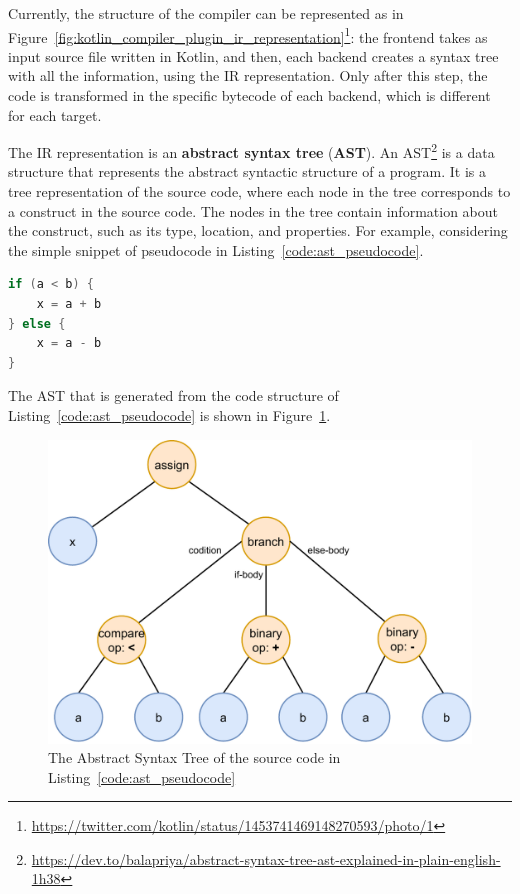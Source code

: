 Currently, the structure of the compiler can be represented as in Figure~\ref{fig:kotlin_compiler_plugin_ir_representation}\footnote{\url{https://twitter.com/kotlin/status/1453741469148270593/photo/1}}: the frontend takes as input source file written in Kotlin, and then, each backend creates a syntax tree with all the information, using the IR representation. Only after this step, the code is transformed in the specific bytecode of each backend, which is different for each target.

The IR representation is an \textbf{abstract syntax tree} (\textbf{AST}). An AST\footnote{\url{https://dev.to/balapriya/abstract-syntax-tree-ast-explained-in-plain-english-1h38}} is a data structure that represents the abstract syntactic structure of a program. It is a tree representation of the source code, where each node in the tree corresponds to a construct in the source code. The nodes in the tree contain information about the construct, such as its type, location, and properties.\newline
For example, considering the simple snippet of pseudocode in Listing~\ref{code:ast_pseudocode}.
\begin{lstlisting}[caption={Pseudocode of a simple assignment and expression}, language=Kotlin, captionpos=b, label={code:ast_pseudocode}]
if (a < b) {
    x = a + b
} else {
    x = a - b
}
\end{lstlisting}
The AST that is generated from the code structure of Listing~\ref{code:ast_pseudocode} is shown in Figure~\ref{fig:ast_pseudocode_example}.
\begin{figure}[!ht]
    \centering
    \includegraphics[scale=0.8]{document/chapters/2-metaprogramming/images/ast_pseudocode_example.pdf}
    \caption{The Abstract Syntax Tree of the source code in Listing~\ref{code:ast_pseudocode}}
    \label{fig:ast_pseudocode_example}
\end{figure}
